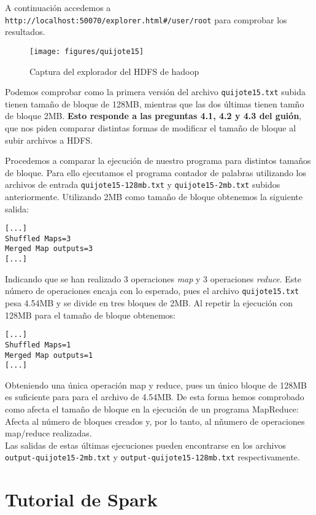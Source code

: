 \documentclass[11pt]{article}
\def\inline{\lstinline[basicstyle=\ttfamily,keywordstyle={}]}
\begin{document}
A continuación accedemos a \inline{http://localhost:50070/explorer.html#/user/root} para comprobar los resultados.

\begin{figure}[H]
  \centering
  \texttt{[image: figures/quijote15]}
  \caption{Captura del explorador del HDFS de hadoop}
\end{figure}

Podemos comprobar como la primera versión del archivo \inline{quijote15.txt} subida tienen tamaño de bloque de 128MB, mientras que las dos últimas tienen tamño de bloque 2MB. \textbf{Esto responde a las preguntas 4.1, 4.2 y 4.3 del guión}, que nos piden comparar distintas formas de modificar el tamaño de bloque al subir archivos a HDFS.

Procedemos a comparar la ejecución de nuestro programa para distintos tamaños de bloque. Para ello ejecutamos el programa contador de palabras utilizando los archivos de entrada \inline{quijote15-128mb.txt} y \inline{quijote15-2mb.txt} subidos anteriormente. Utilizando 2MB como tamaño de bloque obtenemos la siguiente salida:

\begin{verbatim}
[...]
Shuffled Maps=3
Merged Map outputs=3
[...]
\end{verbatim}

Indicando que se han realizado 3 operaciones \emph{map} y 3 operaciones \emph{reduce}. Este número de operaciones encaja con lo esperado, pues el archivo \inline{quijote15.txt} pesa 4.54MB y se divide en tres bloques de 2MB. Al repetir la ejecución con 128MB para el tamaño de bloque obtenemos:

\begin{verbatim}
[...]
Shuffled Maps=1
Merged Map outputs=1
[...]
\end{verbatim}

Obteniendo una única operación map y reduce, pues un único bloque de 128MB es suficiente para para el archivo de 4.54MB. De esta forma hemos comprobado como afecta el tamaño de bloque en la ejecución de un programa MapReduce: Afecta al número de bloques creados y, por lo tanto, al nñumero de operaciones map/reduce realizadas.\\

Las salidas de estas últimas ejecuciones pueden encontrarse en los archivos \inline{output-quijote15-2mb.txt} y \inline{output-quijote15-128mb.txt} respectivamente.


\newpage
\section{ Tutorial de Spark}
\end{document}
